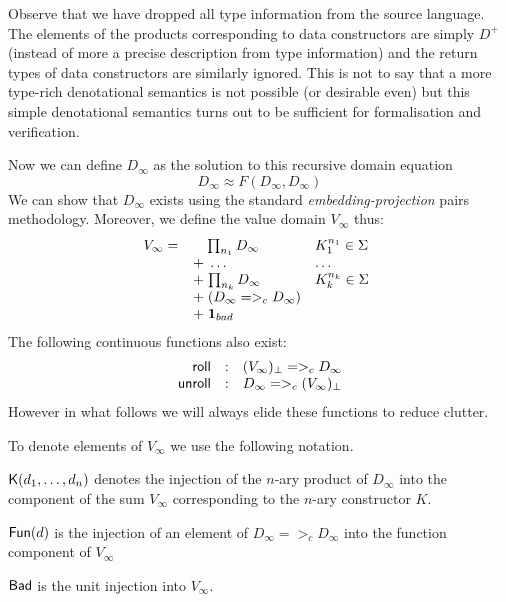 Observe that we have dropped all type information from the source
language. The elements of the products corresponding to data
constructors are simply $D^{+}$ (instead of more a precise description
from type information) and the return types of data constructors are
similarly ignored. This is not to say that a more type-rich
denotational semantics is not possible (or desirable even) but this
simple denotational semantics turns out to be sufficient for
formalisation and verification.


Now we can define $D_{\infty}$ as the solution to this recursive domain equation
$$D_{\infty} \approx F( D_{\infty}, D_{\infty})$$
We can show that $D_{\infty}$ exists using the
standard {\em embedding-projection} pairs methodology. Moreover, we define the
value domain $V_{\infty}$ thus:
    \[V_{\infty} = \begin{array}[t]{ll}
             \quad\;{\prod_{n_1}{D_{\infty}}} & K_1^{n_1} \in \Sigma \\
             \; + \;\ldots                    & \ldots \\
             \; + \;{\prod_{n_k}{D_{\infty}}} & K_k^{n_k} \in \Sigma \\
             \; + \;(D_{\infty} =>_c D_{\infty}) \\
             \; + \;{\sf{\bf 1}}_{bad} \quad
    \end{array}\]
The following continuous functions also exist:
\[\begin{array}{rcl}
  \mathsf{roll} & : & (V_{\infty})_\bot =>_c D_{\infty} \\
  \mathsf{unroll} & : &D_{\infty} =>_c (V_{\infty})_\bot
\end{array}\]
However in what follows we will always elide these functions to reduce clutter.

To denote elements of $V_{\infty}$ we use the following notation.
\begin{itemize*}
\item $\mathsf{K}(d_1, \ldots, d_n)$ denotes the injection of
the $n$-ary product of $D_{\infty}$ into the component of the sum
$V_{\infty}$ corresponding to the $n$-ary constructor $K$.
\item $\mathsf{Fun}(d)$ is the injection of
an element of $D_{\infty} =>_c D_{\infty}$ into the function component of $V_{\infty}$
\item $\mathsf{Bad}$ is the unit injection into $V_{\infty}$.
\end{itemize*}

